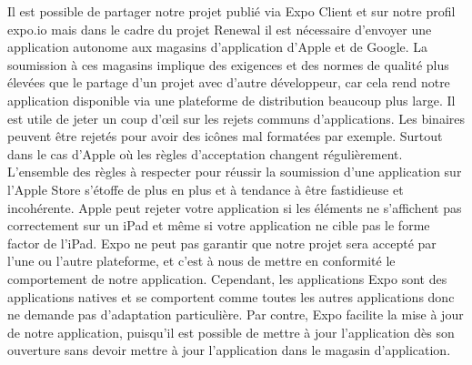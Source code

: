 Il est possible de partager notre projet publié via Expo Client et sur notre profil expo.io mais dans le cadre du projet Renewal il est nécessaire d'envoyer une application autonome aux magasins d'application d'Apple et de Google. La soumission à ces magasins implique des exigences et des normes de qualité plus élevées que le partage d'un projet avec d'autre développeur, car cela rend notre application disponible via une plateforme de distribution beaucoup plus large. Il est utile de jeter un coup d'œil sur les rejets communs d'applications. Les binaires peuvent être rejetés pour avoir des icônes mal formatées par exemple. Surtout dans le cas d'Apple où les règles d’acceptation changent régulièrement. L’ensemble des règles à respecter pour réussir la soumission d’une application sur l’Apple Store s’étoffe de plus en plus et à tendance à être fastidieuse et incohérente. Apple peut rejeter votre application si les éléments ne s'affichent pas correctement sur un iPad et même si votre application ne cible pas le forme factor de l'iPad. Expo ne peut pas garantir que notre projet sera accepté par l'une ou l'autre plateforme, et c’est à nous de mettre en conformité le comportement de notre application. Cependant, les applications Expo sont des applications natives et se comportent comme toutes les autres applications donc ne demande pas d'adaptation particulière. Par contre, Expo facilite la mise à jour de notre application, puisqu’il est possible de mettre à jour l’application dès son ouverture sans devoir mettre à jour l’application dans le magasin d’application. 





